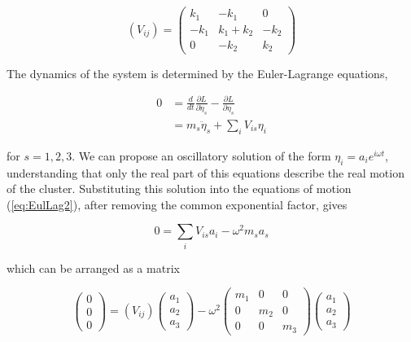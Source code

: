 \begin{equation}
  (V_{ij})=\left( \begin{array}{ccc} k_1 & -k_1 & 0 \\ -k_1 & k_1+k_2 & -k_2 \\ 0 & -k_2 & k_2 \end{array} \right)
\end{equation}

The dynamics of the system is determined by the Euler-Lagrange equations,

\begin{align}
  0 & = \frac{d}{dt}\frac{\partial L}{\partial \dot{\eta}_s}-\frac{\partial L}{\partial \eta_s} \label{eq:EulLag1} \\
    & = m_s \ddot{\eta}_s + \sum_i V_{is} \eta_i \label{eq:EulLag2}
\end{align}

\noindent for $s=1,2,3$. 
We can propose an oscillatory solution of the form $\eta_i=a_ie^{i\omega t}$, understanding that only the real part of this equations describe the real motion of the cluster. 
Substituting this solution into the equations of motion (\ref{eq:EulLag2}), after removing the common exponential factor, gives

\begin{equation}
  0=\sum_i V_{is}a_i-\omega^2m_sa_s
\end{equation}

which can be arranged as a matrix

\begin{equation}
  \left( 
    \begin{array}{c} 
      0\\ 0\\ 0 
    \end{array}
  \right) = (V_{ij}) \left(
    \begin{array}{c}
      a_1 \\ a_2 \\ a_3 
    \end{array}
  \right) - \omega^2 \left(
    \begin{array}{ccc}
      m_1 & 0 & 0 \\ 0 & m_2 & 0 \\ 0 & 0 & m_3
    \end{array}\right) \left(
    \begin{array}{c} 
      a_1 \\ a_2 \\ a_3 
    \end{array}
  \right)
\end{equation}

